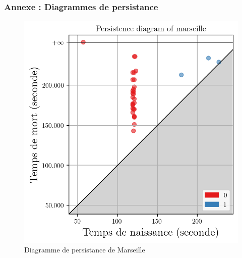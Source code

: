 \documentclass{beamer}
\begin{document}
\begin{frame}
    \frametitle{Annexe : Diagrammes de persistance}

    \begin{figure}[h]
        \centering
        \begin{minipage}[c]{.45\linewidth}
            \centering
            \includegraphics[width=1\textwidth]{../../Code/images/pd_marseille.png}
            \caption{Diagramme de persistance de Marseille}
        \end{minipage}
        \hfill
        \begin{minipage}[c]{.45\linewidth}
            \centering

\end{minipage}
\end{figure}
\end{frame}
\end{document}

